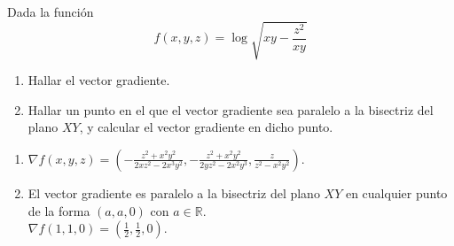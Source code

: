 {Dada la función
\[
f(x,y,z)=\log \sqrt{xy-\frac{z^2}{xy}}
\]
\begin{enumerate}
\item Hallar el vector gradiente.
\item Hallar un punto en el que el vector gradiente sea paralelo a la bisectriz del plano $XY$, y calcular el vector gradiente en dicho punto.
\end{enumerate}
}
{\begin{enumerate}
\item $\nabla f(x,y,z) = \left( -\frac{z^2+x^2y^2}{2xz^2-2x^3y^2} , -\frac{z^2+x^2y^2}{2yz^2-2x^2y^3} , \frac{z}{z^2-x^2y^2}  \right) $.
\item El vector gradiente es paralelo a la bisectriz del plano $XY$ en cualquier punto de la forma $(a,a,0)$ con $a\in \mathbb{R}$.\\
$\nabla f(1,1,0) = \left(\frac{1}{2},\frac{1}{2},0\right)$. 
\end{enumerate}
}
{
}


